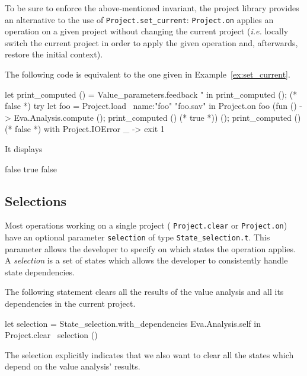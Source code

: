 To be sure to enforce the above-mentioned invariant, the project library
provides an alternative to the use of
\texttt{Project.set\_current}:
\texttt{Project.on} applies an operation on a
given project without changing the current project (\emph{i.e.} locally switch
the current project in order to apply the given operation and, afterwards,
restore the initial context).
\begin{example}
The following code is equivalent to the one given in
Example~\ref{ex:set_current}.
\begin{ocamlcode}
let print_computed () =
  Value_parameters.feedback "%
in
print_computed ();   (* false *)
try
  let foo = Project.load ~name:"foo" "foo.sav" in
  Project.on foo
    (fun () -> Eva.Analysis.compute (); print_computed () (* true *)) ();
  print_computed ()    (* false *)
with Project.IOError _ ->
  exit 1
\end{ocamlcode}
It displays
\begin{logs}
false
true
false
\end{logs}
\end{example}

\subsection{Selections}\label{proj:selection}

Most operations working on a single project (\eg
\texttt{Project.clear} or
\texttt{Project.on}) have an optional parameter
\texttt{selection} of type
\texttt{State\_selection.t}. This parameter allows the
developer to specify on which states the operation
applies. A \emph{selection} is a set of states which allows the developer to
consistently handle state dependencies.
\begin{example}
  The following statement clears all the results of the value analysis and all
  its dependencies in the current project.
\begin{ocamlcode}
let selection = State_selection.with_dependencies Eva.Analysis.self in
Project.clear ~selection ()
\end{ocamlcode}
The selection explicitly indicates that we also want to clear all the states
which depend on the value analysis' results.
\end{example}

